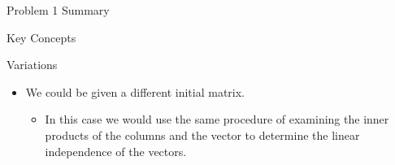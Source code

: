 \begin{summary}{Problem 1 Summary}
\begin{statement}{Key Concepts}
    \end{statement}
    \begin{statement}{Variations}
        \begin{itemize}
            \item We could be given a different initial matrix.
            \begin{itemize}
                \item In this case we would use the same procedure of examining the inner products of the columns and the vector to determine the linear independence of the vectors.
            \end{itemize}
        \end{itemize}
    \end{statement}
\end{summary}

